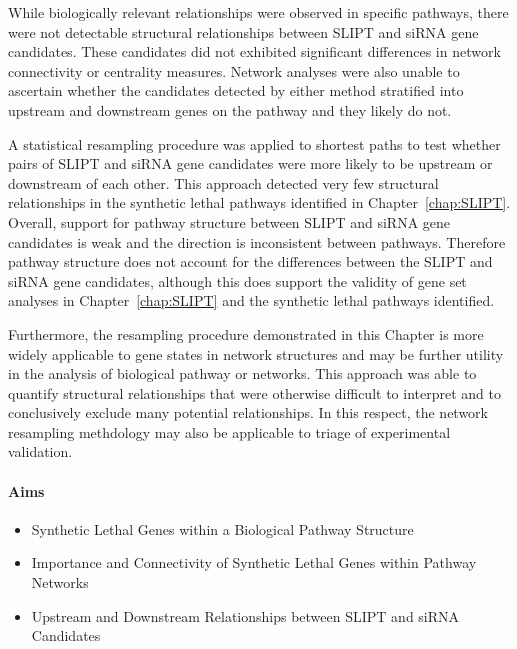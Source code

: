 While biologically relevant relationships were observed in specific pathways, there were not detectable structural relationships between \gls{SLIPT} and \gls{siRNA} gene candidates. These candidates did not exhibited significant differences in network connectivity or centrality measures. Network analyses were also unable to ascertain whether the candidates detected by either method stratified into upstream and downstream genes on the pathway and they likely do not.

A statistical resampling procedure was applied to shortest paths to test whether pairs of \gls{SLIPT} and \gls{siRNA} gene candidates were more likely to be upstream or downstream of each other. This approach detected very few structural relationships in the synthetic lethal pathways identified in Chapter~\ref{chap:SLIPT}. Overall, support for pathway structure between \gls{SLIPT} and \gls{siRNA} gene candidates is weak and the direction is inconsistent between pathways. Therefore pathway structure does not account for the differences between the \gls{SLIPT} and \gls{siRNA} gene candidates, although this does support the validity of gene set analyses in Chapter~\ref{chap:SLIPT} and the synthetic lethal pathways identified.

Furthermore, the resampling procedure demonstrated in this Chapter is more widely applicable to gene states in network structures and may be further utility in the analysis of biological pathway or networks. This approach was able to quantify structural relationships that were otherwise difficult to interpret and to conclusively exclude many potential relationships. In this respect, the network resampling methdology may also be applicable to triage of experimental validation.

\clearpage

\paragraph{Aims}

  \begin{itemize}
   \item Synthetic Lethal Genes within a Biological Pathway Structure
   
   \bigskip
   
   \item Importance and Connectivity of Synthetic Lethal Genes within Pathway Networks
   
   \bigskip
   
   \item Upstream and Downstream Relationships between SLIPT and siRNA Candidates
  \end{itemize}

